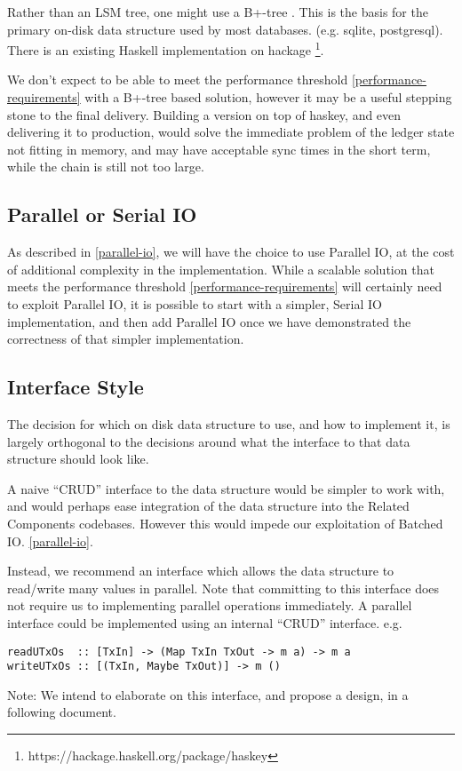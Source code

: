\documentclass[11pt,a4paper]{article}
\begin{document}
Rather than an LSM tree, one might use a B+-tree . This is the basis
for the primary on-disk data structure used by most databases. (e.g. sqlite,
postgresql). There is an existing Haskell implementation on hackage
\footnote{https://hackage.haskell.org/package/haskey}.

We don't expect to be able to meet the performance threshold
\ref{performance-requirements} with a B+-tree based solution, however it may be
a useful stepping stone to the final delivery. Building a version on top of
haskey, and even delivering it to production, would solve the immediate problem
of the ledger state not fitting in memory, and may have acceptable sync times in
the short term, while the chain is still not too large.

\subsection{Parallel or Serial IO}

As described in \ref{parallel-io}, we will have the choice to use Parallel IO,
at the cost of additional complexity in the implementation. While a scalable
solution that meets the performance threshold \ref{performance-requirements}
will certainly need to exploit Parallel IO, it is possible to start
with a simpler, Serial IO implementation, and then add Parallel IO once we have
demonstrated the correctness of that simpler implementation.

\subsection{Interface Style}

The decision for which on disk data structure to use, and how to implement it,
is largely orthogonal to the decisions around what the interface to that data
structure should look like.

A naive ``CRUD'' interface to the data structure would be simpler to work with,
and would perhaps ease integration of the data structure into the Related Components
codebases. However this would impede our exploitation of Batched IO. \ref{parallel-io}.

Instead, we recommend an interface which allows the data structure to read/write
many values in parallel. Note that committing to this interface does not require
us to implementing parallel operations immediately. A parallel interface could
be implemented using an internal ``CRUD'' interface. e.g.
\begin{verbatim}
readUTxOs  :: [TxIn] -> (Map TxIn TxOut -> m a) -> m a
writeUTxOs :: [(TxIn, Maybe TxOut)] -> m ()
\end{verbatim}
Note: We intend to elaborate on this interface, and propose a design, in a
following document.
\end{document}
